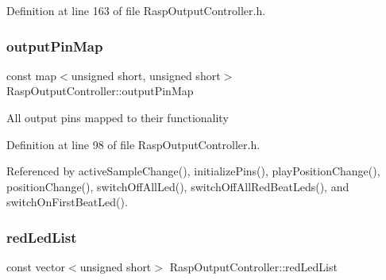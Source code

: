 Definition at line 163 of file Rasp\+Output\+Controller.\+h.

\mbox{\label{class_rasp_output_controller_afd8a9fff94ee9bcf63bcbe6fa810aa32}} 
\subsubsection{\texorpdfstring{output\+Pin\+Map}{outputPinMap}}
{\footnotesize\ttfamily const map$<$unsigned short, unsigned short$>$ Rasp\+Output\+Controller\+::output\+Pin\+Map\hspace{0.3cm}{\ttfamily [private]}}

All output pins mapped to their functionality 

Definition at line 98 of file Rasp\+Output\+Controller.\+h.



Referenced by active\+Sample\+Change(), initialize\+Pins(), play\+Position\+Change(), position\+Change(), switch\+Off\+All\+Led(), switch\+Off\+All\+Red\+Beat\+Leds(), and switch\+On\+First\+Beat\+Led().

\mbox{\label{class_rasp_output_controller_a8ee2d3ff908d1094cc9d1320133d0bdf}} 
\subsubsection{\texorpdfstring{red\+Led\+List}{redLedList}}
{\footnotesize\ttfamily const vector$<$unsigned short$>$ Rasp\+Output\+Controller\+::red\+Led\+List\hspace{0.3cm}{\ttfamily [private]}}

